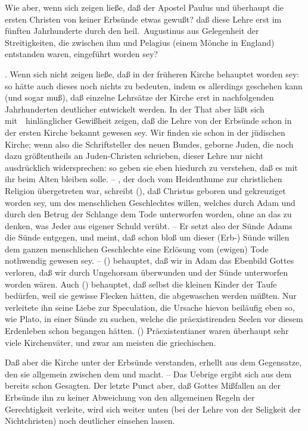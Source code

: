 \begin{aufza}
 Wie aber, wenn sich zeigen ließe, daß der Apostel Paulus und überhaupt die ersten Christen von keiner Erbsünde etwas gewußt? daß diese Lehre erst im fünften Jahrhunderte durch den heil.\ Augustinus aus Gelegenheit der Streitigkeiten, die zwischen ihm und Pelagius (einem Mönche in England) entstanden waren, eingeführt worden sey?\par
{}. Wenn sich nicht zeigen ließe, daß in der früheren Kirche  behauptet worden sey: so hätte auch dieses noch nichts zu bedeuten, indem es allerdings geschehen kann (und sogar muß), daß einzelne Lehrsätze der Kirche erst in nachfolgenden Jahrhunderten deutlicher entwickelt werden. In der That aber läßt sich mit~\ hinlänglicher Gewißheit zeigen, daß die Lehre von der Erbsünde schon in der ersten Kirche bekannt gewesen sey. Wir finden sie schon in der jüdischen Kirche; wenn also die Schriftsteller des neuen Bundes, geborne Juden, die noch dazu größtentheils an Juden-Christen schrieben, dieser Lehre nur nicht ausdrücklich widersprechen: so geben sie eben hiedurch zu verstehen, daß es mit ihr beim Alten bleiben solle. -- , der doch vom Heidenthume zur christlichen Religion übergetreten war, schreibt (), daß Christus geboren und gekreuziget worden sey, um des menschlichen Geschlechtes willen, welches durch Adam und durch den Betrug der Schlange dem Tode unterworfen worden, ohne an das zu denken, was Jeder aus eigener Schuld verübt. -- Er setzt also der Sünde Adams die  Sünde entgegen, und meint, daß schon bloß um dieser (Erb-) Sünde willen dem ganzen menschlichen Geschlechte eine Erlösung vom (ewigen) Tode nothwendig gewesen sey. --  () behauptet, daß wir in Adam das Ebenbild Gottes verloren, daß wir durch Ungehorsam überwunden und der Sünde unterworfen worden wären. Auch  () behauptet, daß selbst die kleinen Kinder der Taufe bedürfen, weil sie gewisse Flecken hätten, die abgewaschen werden müßten. Nur verleitete ihn seine Liebe zur Speculation, die Ursache hievon beiläufig eben so, wie Plato, in einer Sünde zu suchen, welche die präexistirenden Seelen vor diesem Erdenleben schon begangen hätten. () Präexistentianer waren überhaupt sehr viele Kirchenväter, und zwar am meisten die griechischen.
\item Daß aber die Kirche unter der Erbsünde  verstanden, erhellt aus dem Gegensatze, den sie allgemein zwischen dem  und  macht. -- Das Uebrige ergibt sich aus dem bereits schon Gesagten. Der letzte Punct aber, daß Gottes Mißfallen an der Erbsünde ihn zu keiner Abweichung von den allgemeinen Regeln der Gerechtigkeit verleite, wird sich weiter unten (bei der Lehre von der Seligkeit der Nichtchristen) noch deutlicher einsehen lassen.~
\end{aufza}

